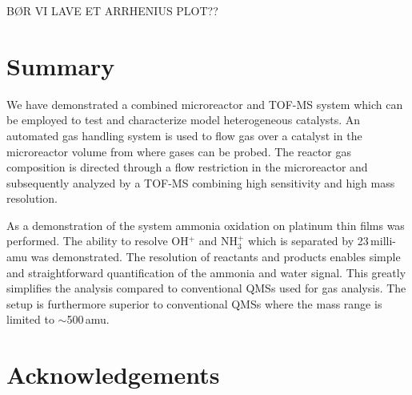 \documentclass[aip,rsi]{revtex4-1}
\begin{document}
BØR VI LAVE ET ARRHENIUS PLOT??

\section{Summary}
We have demonstrated a combined microreactor and TOF-MS system which can be employed to test and characterize model heterogeneous catalysts. An automated gas handling system is used to flow gas over a catalyst in the microreactor volume from where gases can be probed. The reactor gas composition is directed through a flow restriction in the microreactor and subsequently analyzed by a TOF-MS combining high sensitivity and high mass resolution.

As a demonstration of the system ammonia oxidation on platinum thin films was performed. The ability to resolve OH$^{+}$ and NH$_3^+$ which is separated by 23\,milli-amu was demonstrated. The resolution of reactants and products enables simple and straightforward quantification of the ammonia and water signal. This greatly simplifies the analysis compared to conventional QMSs used for gas analysis. The setup is furthermore superior to conventional QMSs where the mass range is limited to $\sim$500\,amu.

\section{Acknowledgements}


%
%

%
\end{document}
